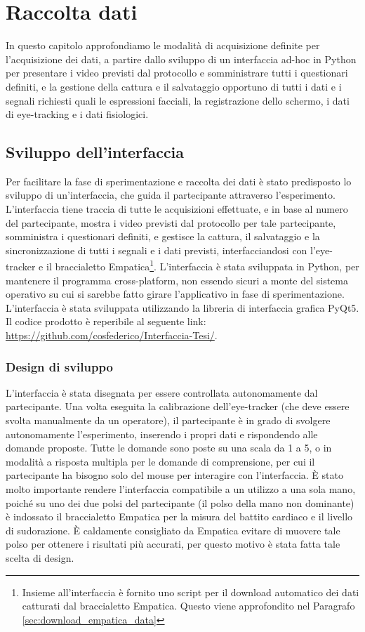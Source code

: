 \chapter{Raccolta dati}

In questo capitolo approfondiamo le modalità di acquisizione definite per l'acquisizione dei dati, a partire dallo sviluppo di un interfaccia ad-hoc in Python per presentare i video previsti dal protocollo e somministrare tutti i questionari definiti, e la gestione della cattura e il salvataggio opportuno di tutti i dati e i segnali richiesti quali le espressioni facciali, la registrazione dello schermo, i dati di eye-tracking e i dati fisiologici.

\section{Sviluppo dell'interfaccia}

Per facilitare la fase di sperimentazione e raccolta dei dati è stato predisposto lo sviluppo di un'interfaccia, che guida il partecipante attraverso l'esperimento. L'interfaccia tiene traccia di tutte le acquisizioni effettuate, e in base al numero del partecipante, mostra i video previsti dal protocollo per tale partecipante, somministra i questionari definiti, e gestisce la cattura, il salvataggio e la sincronizzazione di tutti i segnali e i dati previsti, interfacciandosi con l'eye-tracker e il braccialetto Empatica\footnote{Insieme all'interfaccia è fornito uno script per il download automatico dei dati catturati dal braccialetto Empatica. Questo viene approfondito nel Paragrafo \ref{sec:download_empatica_data}}. L'interfaccia è stata sviluppata in Python, per mantenere il programma cross-platform, non essendo sicuri a monte del sistema operativo su cui si sarebbe fatto girare l'applicativo in fase di sperimentazione. L'interfaccia è stata sviluppata utilizzando la libreria di interfaccia grafica PyQt5. Il codice prodotto è reperibile al seguente link: \url{https://github.com/cosfederico/Interfaccia-Tesi/}.

\subsection{Design di sviluppo}

L'interfaccia è stata disegnata per essere controllata autonomamente dal partecipante. Una volta eseguita la calibrazione dell'eye-tracker (che deve essere svolta manualmente da un operatore), il partecipante è in grado di svolgere autonomamente l'esperimento, inserendo i propri dati e rispondendo alle domande proposte. Tutte le domande sono poste su una scala da 1 a 5, o in modalità a risposta multipla per le domande di comprensione, per cui il partecipante ha bisogno solo del mouse per interagire con l'interfaccia. È stato molto importante rendere l'interfaccia compatibile a un utilizzo a una sola mano, poiché su uno dei due polsi del partecipante (il polso della mano non dominante) è indossato il braccialetto Empatica per la misura del battito cardiaco e il livello di sudorazione. È caldamente consigliato da Empatica evitare di muovere tale polso per ottenere i risultati più accurati, per questo motivo è stata fatta tale scelta di design.

